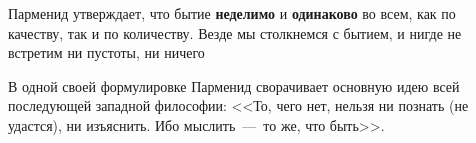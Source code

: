
Парменид утверждает, что бытие \textbf{неделимо} и \textbf{одинаково} во всем, как по качеству, так и по количеству. Везде мы столкнемся с бытием, и нигде не встретим ни пустоты, ни ничего

В одной своей формулировке Парменид сворачивает основную идею всей последующей западной философии: <<То, чего нет, нельзя ни познать (не удастся), ни изъяснить. Ибо мыслить~---~то же, что быть>>. 


